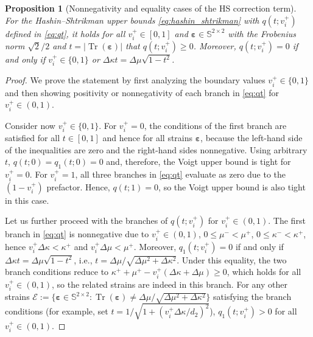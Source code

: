 \documentclass[preprint,3p]{elsarticle}
\newcommand{\tenss}[1]{\bm{\mathbf{#1}}}            %
\newcommand{\strain}{\tenss{\varepsilon}}           %
\newcommand{\Tr}{\operatorname{Tr}}
\newtheorem{proposition}{Proposition}[section]
\begin{document}
\begin{proposition}[Nonnegativity and equality cases of the HS correction term]\label{prop:q_ge_0}
    For the Hashin--Shtrikman upper bounds \eqref{eq:hashin_shtrikman} with $q(t;v_i^+)$ defined in \eqref{eq:qt}, it holds for all $v_i^+ \in [0,1]$ and $\strain \in \mathbb{S}^{2\times2}$ with the Frobenius norm $\sqrt{2}/2$ and $t = \lvert \Tr(\strain)\rvert$ that $q(t;v_i^+) \ge 0$. Moreover, $q(t;v_i^+) = 0$ if and only if $v_i^+ \in \{0,1\}$ or $\Delta \kappa t = \Delta \mu \sqrt{1-t^2}$.
\end{proposition}
\begin{proof}
    We prove the statement by first analyzing the boundary values $v_i^+ \in \{0,1\}$ and then showing positivity or nonnegativity of each branch in \eqref{eq:qt} for $v_i^+ \in (0,1)$.

    Consider now $v_i^+ \in \{0,1\}$. For $v_i^+ = 0$, the conditions of the first branch are satisfied for all $t\in [0,1]$ and hence for all strains $\strain$, because the left-hand side of the inequalities are zero and the right-hand sides nonnegative. Using arbitrary $t$, $q(t;0) = q_1(t;0) = 0$ and, therefore, the Voigt upper bound is tight for $v_i^+ = 0$.  For $v_i^+ = 1$, all three branches in \eqref{eq:qt} evaluate as zero due to the $(1-v_i^+)$ prefactor. Hence, $q(t;1) = 0$, so the Voigt upper bound is also tight in this case.

    Let us further proceed with the branches of $q(t;v_i^+)$ for $v_i^+ \in (0,1)$. The first branch in \eqref{eq:qt} is nonnegative due to $v_i^+ \in (0,1)$, $0\le \mu^- <\mu^+$, $0 \le \kappa^- < \kappa^+$, hence $v_i^+ \Delta \kappa < \kappa^+$ and $v_i^+ \Delta \mu < \mu^+$. Moreover, $q_1(t;v_i^+)=0$ if and only if $\Delta\kappa t=\Delta\mu \sqrt{1-t^2}$, i.e., $t=\Delta \mu /\sqrt{\Delta\mu^2 + \Delta\kappa^2}$. Under this equality, the two branch conditions reduce to $\kappa^+ + \mu^+ - v_i^+ (\Delta\kappa + \Delta \mu) \ge 0$, which holds for all $v_i^+ \in (0,1)$, so the related strains are indeed in this branch. For any other strains $\mathcal{E}:=\{\strain \in \mathbb{S}^{2\times2}: \Tr(\strain)\neq\Delta \mu /\sqrt{\Delta\mu^2 + \Delta\kappa^2}\}$ satisfying the branch conditions (for example, set $t=1/\sqrt{1 + (v_i^+\Delta\kappa/d_2)^2}$), $q_1(t;v_i^+)>0$ for all $v_i^+ \in (0,1)$.
    

\end{proof}
\end{document}
